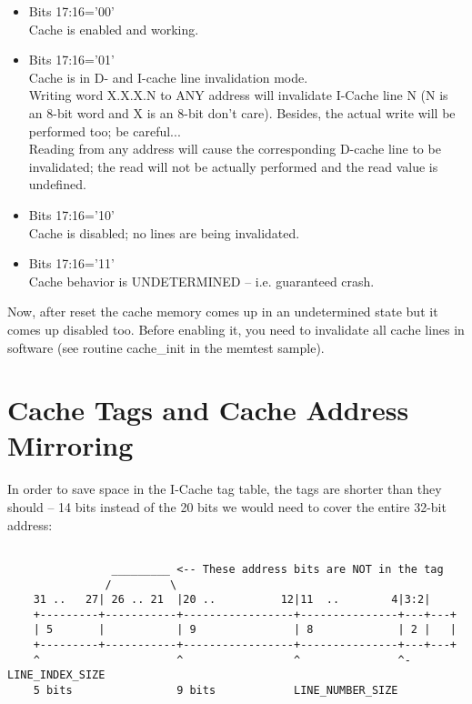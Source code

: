     \begin{itemize}
    \item Bits 17:16='00'\\
        Cache is enabled and working.
    \item Bits 17:16='01'\\
        Cache is in D- and I-cache line invalidation mode.\\
        Writing word X.X.X.N to ANY address will 
        invalidate I-Cache line N (N is an 8-bit word and X is an 8-bit 
        don't care). Besides, the actual write will be performed too; be 
        careful...\\
    
        Reading from any address will cause the 
        corresponding D-cache line to be invalidated; the read will not be
        actually performed and the read value is undefined.\\
    \item Bits 17:16='10'\\
        Cache is disabled; no lines are being invalidated.\\
    \item Bits 17:16='11'\\
        Cache behavior is UNDETERMINED -- i.e. guaranteed crash.\\
    \end{itemize}
    
    Now, after reset the cache memory comes up in an undetermined state but 
    it comes up disabled too. Before enabling it, you need to invalidate all
    cache lines in software (see routine cache\_init in the memtest sample).\\

\section{Cache Tags and Cache Address Mirroring}
\label{cache_tags}

    In order to save space in the I-Cache tag table, the tags are shorter than 
    they should -- 14 bits instead of the 20 bits we would need to cover the
    entire 32-bit address:

\begin{verbatim}

                _________ <-- These address bits are NOT in the tag
               /         \
    31 ..   27| 26 .. 21  |20 ..          12|11  ..        4|3:2|
    +---------+-----------+-----------------+---------------+---+---+
    | 5       |           | 9               | 8             | 2 |   |
    +---------+-----------+-----------------+---------------+---+---+
    ^                     ^                 ^               ^- LINE_INDEX_SIZE
    5 bits                9 bits            LINE_NUMBER_SIZE

    \end{verbatim}\\
    
